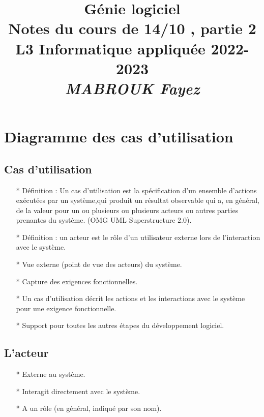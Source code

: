 \documentclass[12pt]{article}
\title{{\bf  Génie logiciel} \\
	Notes du cours de 14/10 , partie 2 \\
	{\small L3 Informatique appliquée 2022-2023} \\
	{\it \small MABROUK Fayez}}
\begin{document}
	\maketitle
\newpage
\section{Diagramme des cas d'utilisation}
\subsection{Cas d'utilisation}
\begin{itemize}
	\item [*] Définition : Un cas d'utilisation est la spécification d'un ensemble d'actions exécutées par un système,qui produit un résultat observable qui a, en général, de la valeur pour un ou plusieurs ou plusieurs acteurs ou autres parties prenantes du système. (OMG UML Superstructure 2.0).
	\item [*] Définition : un acteur est le rôle d'un utilisateur externe lors de l'interaction avec le
	système.
	\item [*] Vue externe (point de vue des acteurs) du système.
	\item [*] Capture des exigences fonctionnelles.
	\item [*] Un cas d'utilisation décrit les actions et les interactions avec le système pour une
	exigence fonctionnelle.
	\item [*] Support pour toutes les autres étapes du développement logiciel.
\end{itemize}
\subsection{L'acteur}
\begin{itemize}
	\item [*] Externe au système.
	\item [*] Interagit directement avec le système.
	\item [*] A un rôle (en général, indiqué par son nom).
	
\end{itemize}
\end{document}
